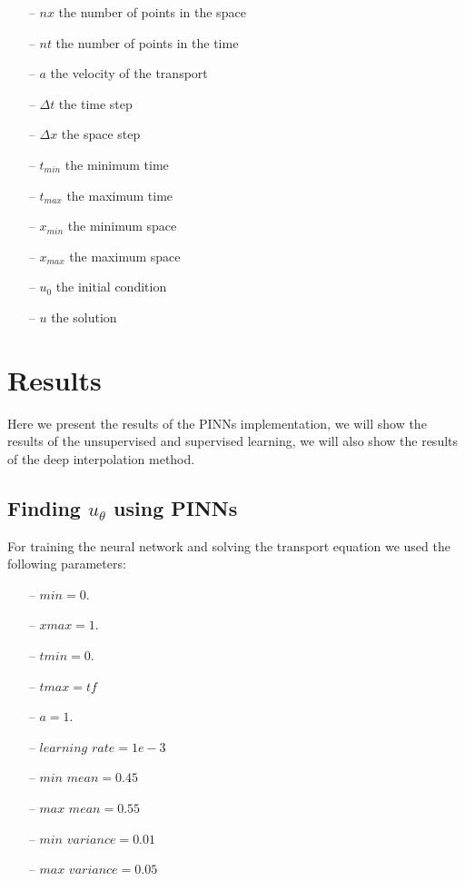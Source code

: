 \documentclass{article}
\begin{document}
\begin{itemize}
    \item[--] $nx$ the number of points in the space
    \item[--] $nt$ the number of points in the time
    \item[--] $a$ the velocity of the transport
    \item[--] $\Delta t$ the time step
    \item[--] $\Delta x$ the space step
    \item[--] $t_{min}$ the minimum time
    \item[--] $t_{max}$ the maximum time
    \item[--] $x_{min}$ the minimum space
    \item[--] $x_{max}$ the maximum space
    \item[--] $u_0$ the initial condition
    \item[--] $u$ the solution
 \end{itemize}

\section{Results}

Here we present the results of the PINNs implementation, we will show the results of the unsupervised and supervised learning, we will also show the results of the deep interpolation method.

\subsection{Finding $u_\theta$ using PINNs}

For training the neural network and solving the transport equation we used the following parameters:

\begin{itemize}
    \item[--] $min = 0.$
    \item[--] $xmax = 1.$
    \item[--] $tmin = 0.$
    \item[--] $tmax = tf$
    \item[--] $a = 1.$
    \item[--] $learning$ $rate = 1e-3$
    \item[--] $min$ $mean = 0.45$
    \item[--] $max$ $mean = 0.55$
    \item[--] $min$ $variance = 0.01$
    \item[--] $max$ $variance = 0.05$
\end{itemize}
\end{document}

